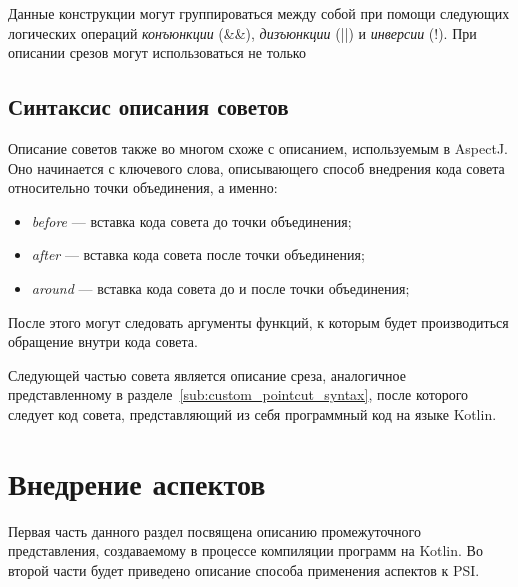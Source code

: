 Данные конструкции могут группироваться между собой при помощи следующих
логических операций \textit{конъюнкции} (\&\&),  \textit{дизъюнкции} (||)  и
\textit{инверсии} (!).
При описании срезов могут использоваться не только 
\subsection{Синтаксис описания советов}
\label{sub:custom_advice_syntax}
Описание советов также во многом схоже с описанием, используемым в AspectJ.
Оно начинается с ключевого слова, описывающего способ внедрения
кода совета относительно точки объединения, а именно:
\begin{itemize}
	\item \textit{before} --- вставка кода совета до точки объединения;
	\item \textit{after} --- вставка кода совета после точки объединения;
	\item \textit{around} --- вставка кода совета до и после точки объединения;
\end{itemize}
После этого могут следовать аргументы функций, к которым будет производиться
обращение внутри кода совета.

Следующей частью совета является описание среза, аналогичное представленному в
разделе~\ref{sub:custom_pointcut_syntax}, после которого следует код совета,
представляющий из себя программный код на языке Kotlin.
\section{Внедрение аспектов}
\label{sub:custom_aspect_weaving}
Первая часть данного раздел посвящена описанию промежуточного представления,
создаваемому в процессе компиляции программ на Kotlin.
Во второй части будет приведено описание способа применения аспектов к PSI.
